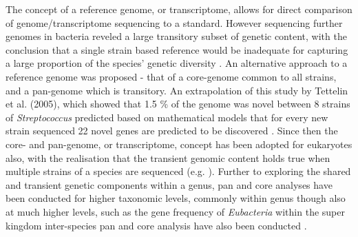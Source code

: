 \documentclass[12pt]{article}
\begin{document}


The concept of a reference genome, or transcriptome, allows for direct comparison of genome/transcriptome sequencing to a standard. 
However sequencing further genomes in bacteria reveled a large transitory subset of genetic content, with the conclusion that a single strain based reference would be inadequate for capturing a large proportion of the species' genetic diversity \cite{tettelin2005genome,vernikos2015ten}. 
An alternative approach to a reference genome was proposed - that of a core-genome common to all strains, and a pan-genome which is transitory. 
An extrapolation of this study by Tettelin et al. (2005), which showed that 1.5 \% of the genome was novel between 8 strains of \textit{Streptococcus} predicted based on mathematical models that for every new strain sequenced 22 novel genes are predicted to be discovered \cite{medini2005microbial}. 
Since then the core- and pan-genome, or transcriptome, concept has been adopted for eukaryotes also, with the realisation that the transient genomic content holds true when multiple strains of a species are sequenced (e.g.  \cite{jin2016maize,plissonneau2018pangenome,read2013pan,li2014novo,song2015agape,posnien2014comprehensive}).  
Further to exploring the shared and transient genetic components within a genus, pan and core analyses have been conducted for higher taxonomic levels, commonly within genus though also at much higher levels, such as the gene frequency of \textit{Eubacteria} within the super kingdom inter-species pan and core analysis have also been conducted \cite{lapierre2009estimating,he2016pan,koid2014comparative,jin2016maize,vernikos2015ten}. 

\end{document}
